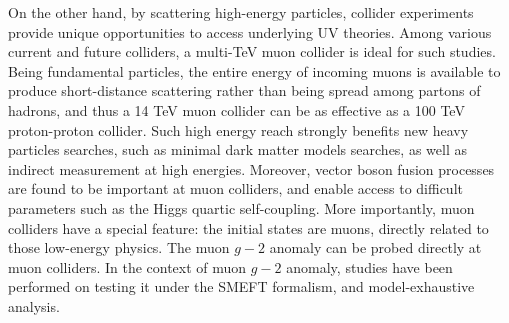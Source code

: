 \documentclass[a4paper,11pt]{article}
\begin{document}
On the other hand, by scattering high-energy particles,
collider experiments provide unique opportunities to access underlying UV theories.
Among various current and future colliders\cite{Shiltsev:2019rfl},
a multi-TeV muon collider\cite{Aime:2022flm,MuonCollider:2022xlm} is ideal for such studies.
Being fundamental particles, the entire energy of incoming muons is available to produce short-distance scattering rather than being spread among partons of hadrons,
and thus a 14 TeV muon collider can be as effective as a 100 TeV proton-proton collider\cite{Delahaye:2019omf}.
Such high energy reach strongly benefits new heavy particles searches, such as minimal dark matter models\cite{Han:2020uak,Bottaro:2021snn} searches,
as well as indirect measurement at high energies\cite{Buttazzo:2020uzc}.
Moreover, vector boson fusion processes are found to be important at muon colliders\cite{Costantini:2020stv},
and enable access to difficult parameters such as the Higgs quartic self-coupling\cite{Chiesa:2020awd}.
More importantly, muon colliders have a special feature: the initial states are muons, directly related to those low-energy physics. 
The muon $g-2$ anomaly can be probed directly at muon colliders\cite{Buttazzo:2020ibd}.
In the context of muon $g-2$ anomaly, studies have been performed on testing it under the SMEFT formalism\cite{Buttazzo:2020ibd}, 
and model-exhaustive analysis\cite{Buttazzo:2020ibd,Capdevilla:2020qel,Capdevilla:2021rwo,Capdevilla:2021kcf,Yin:2020afe}.
\end{document}
